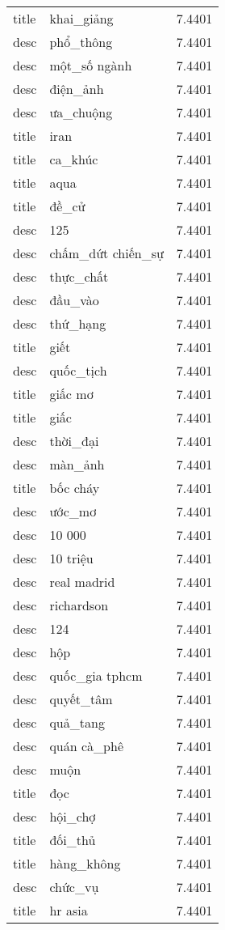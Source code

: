 \documentclass{article}
\begin{document}
\begin{tabular}{lll}
title & khai\_giảng & 7.4401\\
desc & phổ\_thông & 7.4401\\
desc & một\_số ngành & 7.4401\\
desc & điện\_ảnh & 7.4401\\
desc & ưa\_chuộng & 7.4401\\
title & iran & 7.4401\\
title & ca\_khúc & 7.4401\\
title & aqua & 7.4401\\
title & đề\_cử & 7.4401\\
desc & 125 & 7.4401\\
desc & chấm\_dứt chiến\_sự & 7.4401\\
desc & thực\_chất & 7.4401\\
desc & đầu\_vào & 7.4401\\
desc & thứ\_hạng & 7.4401\\
title & giết & 7.4401\\
desc & quốc\_tịch & 7.4401\\
title & giấc mơ & 7.4401\\
title & giấc & 7.4401\\
desc & thời\_đại & 7.4401\\
desc & màn\_ảnh & 7.4401\\
title & bốc cháy & 7.4401\\
desc & ước\_mơ & 7.4401\\
desc & 10 000 & 7.4401\\
desc & 10 triệu & 7.4401\\
desc & real madrid & 7.4401\\
desc & richardson & 7.4401\\
desc & 124 & 7.4401\\
desc & hộp & 7.4401\\
desc & quốc\_gia tphcm & 7.4401\\
desc & quyết\_tâm & 7.4401\\
desc & quả\_tang & 7.4401\\
desc & quán cà\_phê & 7.4401\\
desc & muộn & 7.4401\\
title & đọc & 7.4401\\
desc & hội\_chợ & 7.4401\\
title & đối\_thủ & 7.4401\\
title & hàng\_không & 7.4401\\
desc & chức\_vụ & 7.4401\\
title & hr asia & 7.4401\\

\end{tabular}
\end{document}
